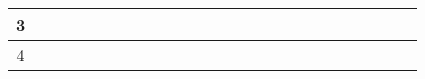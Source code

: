 \begin{table}[h]
\begin{tabular}{|c|cccccccccccc|cccccccccccc|}
		3                        & \multicolumn{1}{c|}{} & \multicolumn{1}{c|}{}                         & \multicolumn{1}{c|}{}                         & \multicolumn{1}{c|}{\cellcolor[HTML]{009901}} & \multicolumn{1}{c|}{\cellcolor[HTML]{009901}} & \multicolumn{1}{c|}{\cellcolor[HTML]{009901}} & \multicolumn{1}{c|}{\cellcolor[HTML]{009901}} & \multicolumn{1}{c|}{\cellcolor[HTML]{009901}} & \multicolumn{1}{c|}{\cellcolor[HTML]{343434}} & \multicolumn{1}{c|}{}                         & \multicolumn{1}{c|}{}                         &                          & \multicolumn{1}{c|}{}                         & \multicolumn{1}{c|}{}                         & \multicolumn{1}{c|}{}                         & \multicolumn{1}{c|}{}                         & \multicolumn{1}{c|}{}                         & \multicolumn{1}{c|}{}                         & \multicolumn{1}{c|}{}                         & \multicolumn{1}{c|}{}                         & \multicolumn{1}{c|}{}                         & \multicolumn{1}{c|}{}                         & \multicolumn{1}{c|}{}                         &  \\ \hline
		4                        & \multicolumn{1}{c|}{} & \multicolumn{1}{c|}{}                         & \multicolumn{1}{c|}{}                         & \multicolumn{1}{c|}{}                         & \multicolumn{1}{c|}{}                         & \multicolumn{1}{c|}{}                         & \multicolumn{1}{c|}{}                         & \multicolumn{1}{c|}{\cellcolor[HTML]{FFFFFF}} & \multicolumn{1}{c|}{\cellcolor[HTML]{343434}} & \multicolumn{1}{c|}{\cellcolor[HTML]{343434}} & \multicolumn{1}{c|}{\cellcolor[HTML]{343434}} & \cellcolor[HTML]{343434} & \multicolumn{1}{c|}{\cellcolor[HTML]{343434}} & \multicolumn{1}{c|}{\cellcolor[HTML]{343434}} & \multicolumn{1}{c|}{\cellcolor[HTML]{343434}} & \multicolumn{1}{c|}{\cellcolor[HTML]{343434}} & \multicolumn{1}{c|}{}                         & \multicolumn{1}{c|}{}                         & \multicolumn{1}{c|}{}                         & \multicolumn{1}{c|}{}                         & \multicolumn{1}{c|}{}                         & \multicolumn{1}{c|}{}                         & \multicolumn{1}{c|}{}                         &  \\ \hline

\end{tabular}
\end{table}
